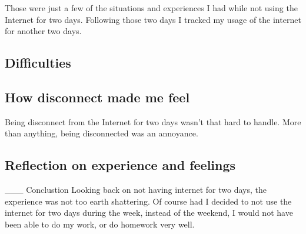 \documentclass[12pt,letterpaper]{article}
\begin{document}
Those were just a few of the situations and experiences I had while not
using the Internet for two days. Following those two days I tracked my
usage of the internet for another two days.


\subsection{Difficulties} \subsection{How disconnect made me feel}

Being disconnect from the Internet for two days wasn't that hard to
handle. More than anything, being disconnected was an annoyance. 


\subsection{Reflection on experience and feelings}







___ Conclustion
Looking back on not having internet for two days, the experience was not
too earth shattering. Of course had I decided to not use the internet
for two days during the week, instead of the weekend, I would not have
been able to do my work, or do homework very well.
\end{document}

